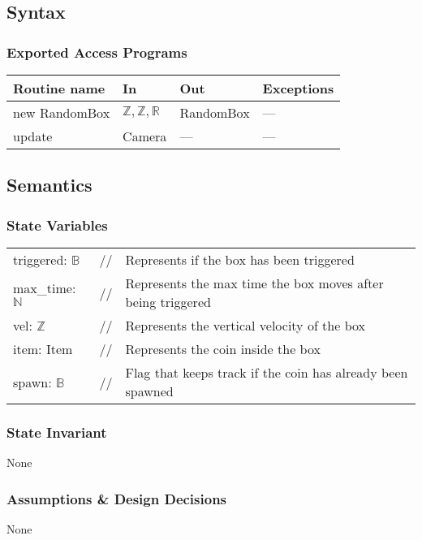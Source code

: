 \documentclass[12pt]{article}
\begin{document}
\subsection* {Syntax}

\subsubsection* {Exported Access Programs}

\begin{tabular}{| l | l | l | l |}
\hline
\textbf{Routine name} & \textbf{In} & \textbf{Out} & \textbf{Exceptions}\\
\hline
new RandomBox & $\mathbb{Z, Z, R}$ & RandomBox & ---\\
\hline
update & Camera & --- & ---\\
\hline
\end{tabular}

\subsection* {Semantics}

\subsubsection* {State Variables}
\begin{tabular}{lll}
triggered: $\mathbb{B}$ & // & Represents if the box has been triggered\\
max\_time: $\mathbb{N}$ & // & Represents the max time the box moves after being triggered\\
vel: $\mathbb{Z}$ & // & Represents the vertical velocity of the box\\
item: Item & // & Represents the coin inside the box\\
spawn: $\mathbb{B}$ & // & Flag that keeps track if the coin has already been spawned
\end{tabular}

\subsubsection* {State Invariant}

None

\subsubsection* {Assumptions \& Design Decisions}

None
\end{document}
